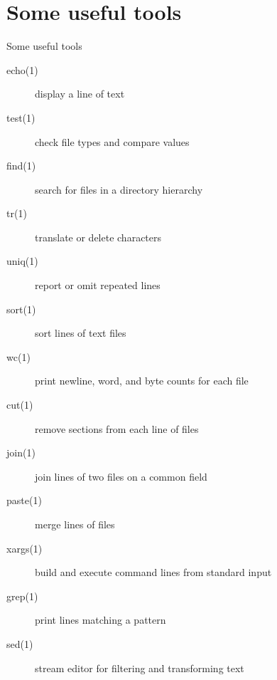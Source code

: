 \documentclass[handout]{beamer}
\begin{document}
\section{Some useful tools}
\begin{frame}{Some useful tools}
	\begin{description}
		\item[echo(1)] display a line of text
		\item[test(1)] check file types and compare values
		\item[find(1)] search for files in a directory hierarchy
		\item[tr(1)] translate or delete characters
		\item[uniq(1)] report or omit repeated lines
		\item[sort(1)] sort lines of text files
		\item[wc(1)] print newline, word, and byte counts for each file
		\item[cut(1)] remove sections from each line of files
		\item[join(1)] join lines of two files on a common field
		\item[paste(1)] merge lines of files
		\item[xargs(1)] build and execute command lines from standard input
		\item[grep(1)] print lines matching a pattern
		\item[sed(1)] stream editor for filtering and transforming text
	\end{description}
\end{frame}
\end{document}
